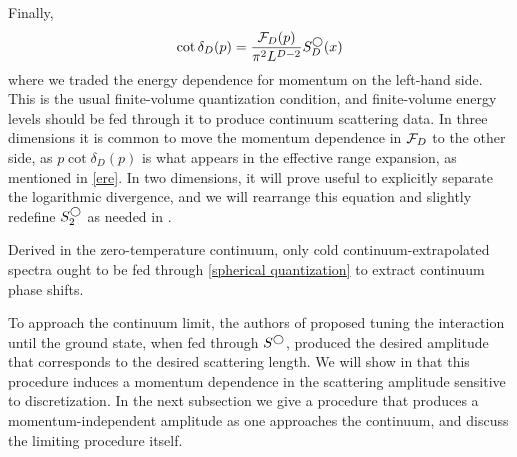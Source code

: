 Finally,
\begin{equation}\label{eq:spherical quantization}
    \cot \delta_{D}(p) = \frac{\mathcal{F}_{D}(p)}{\pi^2 L^{D-2}} S^\bigcirc_D(x)
\end{equation}
where we traded the energy dependence for momentum on the left-hand side.
This is the usual \Luscher finite-volume quantization condition, and finite-volume energy levels should be fed through it to produce continuum scattering data.
In three dimensions it is common to move the momentum dependence in $\mathcal{F}_{D}$ to the other side, as $p \cot\delta_{D}(p)$ is what appears in the effective range expansion, as mentioned in \eqref{ere}.
In two dimensions, it will prove useful to explicitly separate the logarithmic divergence, and we will rearrange this equation and slightly redefine $S^\bigcirc_2$ as needed in .

Derived in the zero-temperature continuum, only cold continuum-extrapolated spectra ought to be fed through \eqref{spherical quantization} to extract continuum phase shifts.

To approach the continuum limit, the authors of  proposed tuning the interaction until the ground state, when fed through $S^\bigcirc$, produced the desired amplitude that corresponds to the desired scattering length.
We will show in  that this procedure induces a momentum dependence in the scattering amplitude sensitive to discretization.
In the next subsection we give a procedure that produces a momentum-independent amplitude as one approaches the continuum, and discuss the limiting procedure itself.
